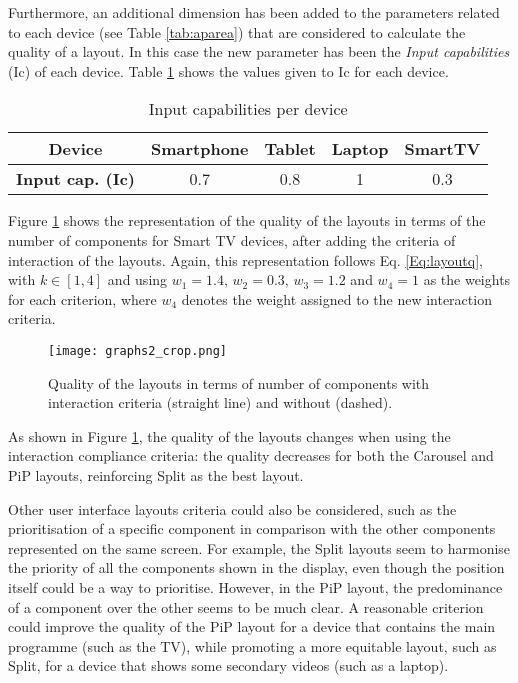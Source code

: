Furthermore, an additional dimension has been added to the parameters related to each device (see Table \ref{tab:aparea}) that are considered to calculate the quality of a layout. 
In this case the new parameter has been the \textit{Input capabilities} (Ic) of each device. Table \ref{tab:devic} shows the values given to Ic for each device.

\begin{table}
	\centering
	\caption {Input capabilities per device}\label{tab:devic}
	\begin{tabular}{||c|c|c|c|c||}
		\hline
		\textbf{Device} & \textbf{Smartphone} & \textbf{Tablet} & \textbf{Laptop} & \textbf{SmartTV}\\
		
		\hline
		\textbf{Input cap. (Ic)} & 0.7 & 0.8 & 1 & 0.3\\
		\hline
	\end{tabular}
\end{table}


Figure \ref{fig:qualIntCrit} shows the representation of the quality of the layouts in terms of the number of components for Smart TV devices, after adding the criteria of interaction of the layouts. Again, this representation follows Eq. \ref{Eq:layoutq}, with $k \in [1,4]$ and using $w_1=1.4$, $w_2=0.3$, $w_3=1.2$ and $w_4=1$ as the weights for each criterion, where $w_4$ denotes the weight assigned to the new interaction criteria.

\begin{figure}
	\begin{center}
		\texttt{[image: graphs2\_crop.png]}
		\caption{Quality of the layouts in terms of number of components with interaction criteria (straight line) and without (dashed).}
		\label{fig:qualIntCrit}
	\end{center}
\end{figure}

As shown in Figure \ref{fig:qualIntCrit}, the quality of the layouts changes when using the interaction compliance criteria: the quality decreases for both the Carousel and PiP layouts, reinforcing Split as the best layout.

Other user interface layouts criteria could also be considered, such as the prioritisation of a specific component in comparison with the other components represented on the same screen. For example, the Split layouts seem to harmonise the priority of all the components shown in the display, even though the position itself could be a way to prioritise. However, in the PiP layout, the predominance of a component over the other seems to be much clear. A reasonable criterion could improve the quality of the PiP layout for a device that contains the main programme (such as the TV), while promoting a more equitable layout, such as Split, for a device that shows some secondary videos (such as a laptop).

